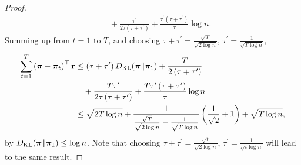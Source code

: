 \begin{proof}
\begin{equation*}
\begin{split}
    &\quad + \frac{\tau^\prime}{2\tau \left(\tau + \tau^\prime\right)} + \frac{\tau^\prime \left( \tau + \tau^\prime \right)}{\tau} \log{n}.
\end{split}
\end{equation*}
Summing up from $t = 1$ to $T$, and choosing $\tau + \tau^\prime = \frac{\sqrt{T}}{\sqrt{2 \log{n}}}$, $\tau^\prime = \frac{1}{\sqrt{T \log{n}}}$,
\begin{equation*}
\begin{split}
    \sum\limits_{t=1}^{T}{\left( {\boldsymbol{\pi}} - {\boldsymbol{\pi}}_t \right)^\top {\mathbf{r}} } &\le \left(\tau + \tau^\prime\right) D_{\mathrm{KL}}{\left( {\boldsymbol{\pi}} \middle\| {\boldsymbol{\pi}}_1 \right)} + \frac{T}{2\left(\tau + \tau^\prime\right)} \\
    &\quad + \frac{T \tau^\prime}{2\tau \left(\tau + \tau^\prime\right)} + \frac{T \tau^\prime \left( \tau + \tau^\prime \right)}{\tau} \log{n} \\
    &\le \sqrt{2T \log{n}} + \frac{1}{\frac{\sqrt{T}}{\sqrt{2 \log{n}}} - \frac{1}{\sqrt{T\log{n}}}} \left( \frac{1}{\sqrt{2}} + 1 \right) + \sqrt{T \log{n}},
\end{split}
\end{equation*}
by $D_{\mathrm{KL}}{\left( {\boldsymbol{\pi}} \middle\| {\boldsymbol{\pi}}_1 \right)} \le \log{n}$. Note that choosing $\tau + \tau^\prime = \frac{\sqrt{t}}{\sqrt{2 \log{n}}}$, $\tau^\prime = \frac{1}{\sqrt{t \log{n}}}$ will lead to the same result.
\end{proof}


